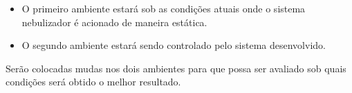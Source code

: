 \begin{itemize}[itemsep=0em]
\item O primeiro ambiente estará sob as condições atuais onde o sistema nebulizador é acionado de maneira estática.
\item O segundo ambiente estará sendo controlado pelo sistema desenvolvido.
\end{itemize}

Serão colocadas mudas nos dois ambientes para que possa ser avaliado sob quais condições será obtido o melhor resultado.